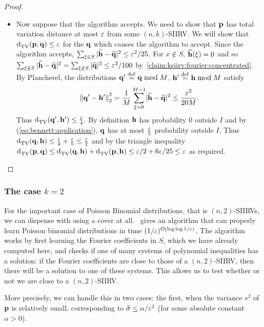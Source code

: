 \begin{proof}
\begin{itemize}
  \item Now suppose that the algorithm accepts. We need to show that $\mathbf{p}$ has total variation distance at most $\varepsilon$ from some $(n,k)$-SIIRV. We will show that $ {\operatorname{d}_{\rm{TV}}^{}\!\left({\mathbf{p}, \mathbf{q}}\right)} \leq \varepsilon$ for the $\mathbf{q}$ which causes the algorithm to accept.  Since the algorithm accepts, $\sum_{\xi \in S} |\widehat{\mathbf{h}}-\widehat{\mathbf{q}}|^2 \leq \varepsilon^2/25$. 
For $x \notin S$, $\widehat{\mathbf{h}}(\xi)=0$ and so $\sum_{\xi \notin S} |\widehat{\mathbf{h}}-\widehat{\mathbf{q}}|^2 = \sum_{\xi \notin S} |\widehat{\mathbf{q}}|^2 \leq \varepsilon^2/100$ by~\cref{claim:ksiirv:fourier:concentrated}. By Plancherel, the distributions $\mathbf{q}'\stackrel{\rm def}{=} \mathbf{q} \bmod M$, $\mathbf{h}'\stackrel{\rm def}{=} \mathbf{h} \bmod M$ satisfy 
\[
  {\lVert \mathbf{q}'-\mathbf{h}'{\rVert}}_2^2 = \frac{1}{M}\sum_{\xi=0}^{M-1} \lvert  \widehat{\mathbf{h}}-\widehat{\mathbf{q}}  \rvert^2 \leq \frac{\varepsilon^2}{20M}.
\] Thus ${\operatorname{d}_{\rm{TV}}^{}\!\left({\mathbf{q}', \mathbf{h}'}\right)} \leq \frac{\varepsilon}{4}$. By definition $\mathbf{h}$ has probability $0$ outside $I$ and by (\ref{eq:bennett:application}), $\mathbf{q}$ has at most $\frac{\varepsilon}{5}$ probability outside $I$, Thus ${\operatorname{d}_{\rm{TV}}^{}\!\left({\mathbf{q}, \mathbf{h}}\right)} \leq \frac{\varepsilon}{4}+\frac{\varepsilon}{5} \leq \frac{\varepsilon}{2}$ and by the triangle inequality $ {\operatorname{d}_{\rm{TV}}^{}\!\left({\mathbf{p}, \mathbf{q}}\right)} \leq {\operatorname{d}_{\rm{TV}}^{}\!\left({\ensuremath{\mathbf{q}}, \ensuremath{\mathbf{h}}}\right)} +  {\operatorname{d}_{\rm{TV}}^{}\!\left({\mathbf{p}, \mathbf{h}}\right)} \leq \varepsilon/2 + 6\varepsilon/25 \leq \varepsilon$ as required.
\end{itemize}
\end{proof}

\subsubsection{The case $k=2$}
For the important case of Poisson Binomial distributions, that is $(n,2)$-SIIRVs, we can dispense with using a cover at all.~\cite{DKS:15b} gives an algorithm that can properly learn Poisson binomial distributions in time $(1/\varepsilon)^{O(\log \log 1/\varepsilon)}$. The algorithm works by first learning the Fourier coefficients in $S$, which we have already computed here, and checks if one of many systems of polynomial inequalities has a solution: if the Fourier coefficients are close to those of a $(n,2)$-SIIRV, then there will be a solution to one of these systems. This allows us to test whether or not we are close to a $(n,2)$-SIIRV.

More precisely, we can handle this in two cases: the first, when the variance $s^2$ of $\mathbf{p}$ is relatively small, corresponding to $\widetilde{\sigma} \leq \alpha/\varepsilon^2$ (for some absolute constant $\alpha >0$).

